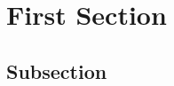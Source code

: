 \documentclass[a4paper]{article}
\begin{document}
\thispagestyle{empty}



\tableofcontents

\listoffigures
\lstlistoflistings
\pagebreak

\section{First Section}
\subsection{Subsection}

\appendix
\end{document}
